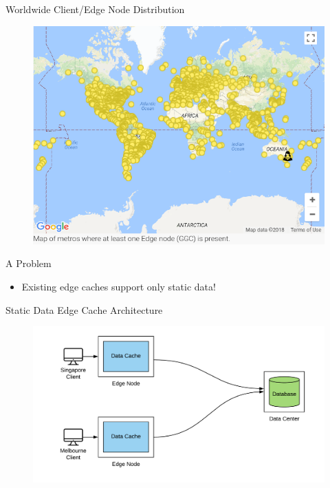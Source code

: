 \documentclass[10pt]{beamer}
\begin{document}
\begin{frame}{Worldwide Client/Edge Node Distribution}
    \begin{figure}
        \center
        \includegraphics[scale=0.45]{apollo_google_oceania_en}
    \end{figure}
\end{frame}

\begin{frame}{A Problem}
    \begin{itemize}
        \item{Existing edge caches support only \alert{static data}!}
    \end{itemize}
\end{frame}

\begin{frame}{Static Data Edge Cache Architecture}
    \begin{figure}
        \center
        \hspace*{-1.5cm}
        \includegraphics[scale=0.17]{apollo_ec_dbl_0}
    \end{figure}
\end{frame}
\end{document}
